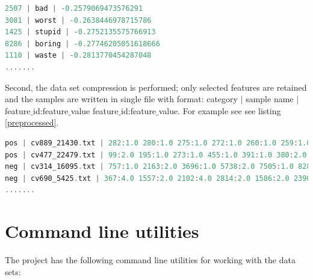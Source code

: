 \documentclass{report}
\begin{document}
\begin{lstlisting}[language=scala, caption={Features file extract}, label={featureextract}]
2507 | bad | -0.2579069473576291
3081 | worst | -0.2638446978715786
1425 | stupid | -0.2752135575766913
8286 | boring | -0.27746205051618666
1110 | waste | -0.2813770454287048
.......
\end{lstlisting}

Second, the data set compression is performed; only selected features are retained and the samples are written in single file with format: category $|$ sample name $|$ feature$\_$id:feature$\_$value feature$\_$id:feature$\_$value. For example see  see listing \ref{preprocessed}.

\begin{lstlisting}[language=scala, caption={Preprocessed samples}, label={preprocessed}]
pos | cv889_21430.txt | 282:1.0 280:1.0 275:1.0 272:1.0 260:1.0 259:1.0 258:1.0 256:2.0
pos | cv477_22479.txt | 99:2.0 195:1.0 273:1.0 455:1.0 391:1.0 380:2.0 376:2.0 178:1.0
neg | cv314_16095.txt | 757:1.0 2163:2.0 3696:1.0 5738:2.0 7505:1.0 8286:1.0 3181:1.0
neg | cv690_5425.txt | 367:4.0 1557:2.0 2102:4.0 2814:2.0 1586:2.0 23901:2.0 8:7.0
.......
\end{lstlisting}

\section{Command line utilities}

The project has the following command line utilities for working with the data sets:
\end{document}
